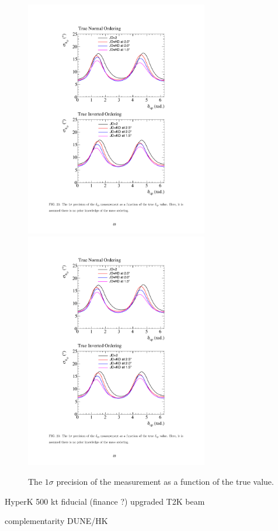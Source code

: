 \begin{figure} [htbp!]
\begin{center}
\includegraphics[width=8cm]{figures/hk_precision_no.pdf}
\includegraphics[width=8cm]{figures/hk_precision_io.pdf}
\caption{\label{fig:hkcpv1} The $1\sigma$ precision of the \dcp measurement as a function of the true \dcp value.}
\end{center}
\end{figure}


HyperK 500 kt fiducial (finance ?) upgraded T2K beam

complementarity DUNE/HK